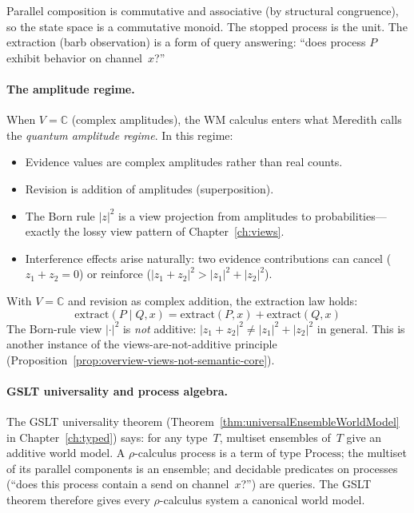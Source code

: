 \noindent
Parallel composition is commutative and associative (by structural
congruence), so the state space is a commutative monoid.  The
stopped process is the unit.  The extraction (barb observation) is
a form of query answering: ``does process $P$ exhibit behavior on
channel~$x$?''

\paragraph{The amplitude regime.}
When $V = \mathbb{C}$ (complex amplitudes), the WM calculus enters
what Meredith calls the \emph{quantum amplitude regime}.  In this
regime:
\begin{itemize}
\item Evidence values are complex amplitudes rather than real counts.
\item Revision is addition of amplitudes (superposition).
\item The Born rule $|z|^2$ is a view projection from amplitudes to
  probabilities---exactly the lossy view pattern of
  Chapter~\ref{ch:views}.
\item Interference effects arise naturally: two evidence
  contributions can cancel ($z_1 + z_2 = 0$) or reinforce
  ($|z_1 + z_2|^2 > |z_1|^2 + |z_2|^2$).
\end{itemize}

\begin{proposition}
\label{prop:amplitude-additive}
With $V = \mathbb{C}$ and revision as complex addition, the
extraction law holds:
\[
  \mathrm{extract}(P \mid Q, x) =
  \mathrm{extract}(P, x) + \mathrm{extract}(Q, x)
\]
The Born-rule view $|\cdot|^2$ is \emph{not} additive:
$|z_1 + z_2|^2 \ne |z_1|^2 + |z_2|^2$ in general.  This is another
instance of the views-are-not-additive principle
(Proposition~\ref{prop:overview-views-not-semantic-core}).
\end{proposition}

\paragraph{GSLT universality and process algebra.}
The GSLT universality theorem
(Theorem~\ref{thm:universalEnsembleWorldModel} in
Chapter~\ref{ch:typed}) says: for any type~$T$, multiset ensembles
of~$T$ give an additive world model.  A $\rho$-calculus process is a
term of type $\mathrm{Process}$; the multiset of its parallel
components is an ensemble; and decidable predicates on processes
(``does this process contain a send on channel~$x$?'') are queries.
The GSLT theorem therefore gives every $\rho$-calculus system a
canonical world model.

